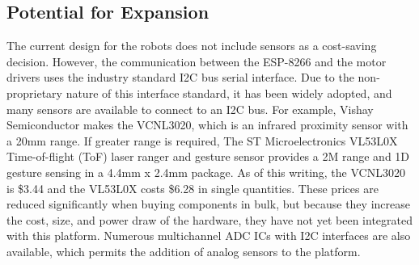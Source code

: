 \documentclass[]{article}
\begin{document}
\subsection{Potential for Expansion}

The current design for the robots does not include sensors as a cost-saving decision. 
However, the communication between the ESP-8266 and the motor drivers uses the industry standard I2C bus serial interface. 
Due to the non-proprietary nature of this interface standard, it has been widely adopted, and many sensors are available to connect to an I2C bus. 
For example, Vishay Semiconductor makes the VCNL3020, which is an infrared proximity sensor with a 20mm range. 
If greater range is required, The ST Microelectronics VL53L0X Time-of-flight (ToF) laser ranger and gesture sensor provides a 2M range and 1D gesture sensing in a 4.4mm x 2.4mm package. 
As of this writing, the VCNL3020 is \$3.44 and the VL53L0X costs \$6.28 in single quantities.
These prices are reduced significantly when buying components in bulk, but because they increase the cost, size, and power draw of the hardware, they have not yet been integrated with this platform. 
Numerous multichannel ADC ICs with I2C interfaces are also available, which permits the addition of analog sensors to the platform. 




\end{document}
